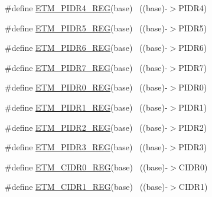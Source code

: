 \begin{DoxyCompactItemize}
\item 
\#define \hyperlink{group___e_t_m___register___accessor___macros_ga86198fa9aafceb1fd3d95b14408f6298}{E\+T\+M\+\_\+\+P\+I\+D\+R4\+\_\+\+R\+EG}(base)                                        ~((base)-\/$>$P\+I\+D\+R4)
\item 
\#define \hyperlink{group___e_t_m___register___accessor___macros_gaca68752a8366e050c469fb3bc3c0b15a}{E\+T\+M\+\_\+\+P\+I\+D\+R5\+\_\+\+R\+EG}(base)                                        ~((base)-\/$>$P\+I\+D\+R5)
\item 
\#define \hyperlink{group___e_t_m___register___accessor___macros_ga768d4ba5229d92d1b94e04290f08c7f6}{E\+T\+M\+\_\+\+P\+I\+D\+R6\+\_\+\+R\+EG}(base)                                        ~((base)-\/$>$P\+I\+D\+R6)
\item 
\#define \hyperlink{group___e_t_m___register___accessor___macros_gaf4b55e52716baaf77e46dd60033b7cfd}{E\+T\+M\+\_\+\+P\+I\+D\+R7\+\_\+\+R\+EG}(base)                                        ~((base)-\/$>$P\+I\+D\+R7)
\item 
\#define \hyperlink{group___e_t_m___register___accessor___macros_gaad937146f4e70f50062ad9a50997edba}{E\+T\+M\+\_\+\+P\+I\+D\+R0\+\_\+\+R\+EG}(base)                                        ~((base)-\/$>$P\+I\+D\+R0)
\item 
\#define \hyperlink{group___e_t_m___register___accessor___macros_gaa9c0c353c3294439b7793c01a40c5c72}{E\+T\+M\+\_\+\+P\+I\+D\+R1\+\_\+\+R\+EG}(base)                                        ~((base)-\/$>$P\+I\+D\+R1)
\item 
\#define \hyperlink{group___e_t_m___register___accessor___macros_gac6dd1196705d5b97a30bf2df98cfb280}{E\+T\+M\+\_\+\+P\+I\+D\+R2\+\_\+\+R\+EG}(base)                                        ~((base)-\/$>$P\+I\+D\+R2)
\item 
\#define \hyperlink{group___e_t_m___register___accessor___macros_ga76b03999855ad9007b2a748b01d74568}{E\+T\+M\+\_\+\+P\+I\+D\+R3\+\_\+\+R\+EG}(base)                                        ~((base)-\/$>$P\+I\+D\+R3)
\item 
\#define \hyperlink{group___e_t_m___register___accessor___macros_gaebeee8969ec0f3a1748df8d2ba4c498a}{E\+T\+M\+\_\+\+C\+I\+D\+R0\+\_\+\+R\+EG}(base)                                        ~((base)-\/$>$C\+I\+D\+R0)
\item 
\#define \hyperlink{group___e_t_m___register___accessor___macros_gaa4e4046ee33f0325c3a62ea713aa8c3b}{E\+T\+M\+\_\+\+C\+I\+D\+R1\+\_\+\+R\+EG}(base)                                        ~((base)-\/$>$C\+I\+D\+R1)

\end{DoxyCompactItemize}
